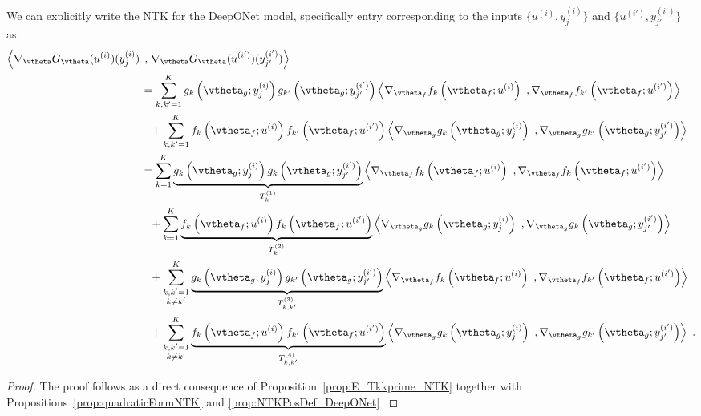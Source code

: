 We can explicitly write the NTK for the DeepONet model, specifically entry corresponding to the inputs $\{u^{(i)}, y^{(i)}_j\}$ and $\{u^{(i')}, y^{(i')}_{j'}\}$ as:
\begin{align}
    \begin{aligned}
        \left\langle  \nabla_{\vtheta}
        G_{\vtheta}(u^{(i)})(y^{(i)}_j) \right. &~,  \left.  \nabla_{\vtheta} G_{\vtheta}(u^{(i')})(y^{(i')}_{j'})  \right\rangle \\
        & = \sum_{k,k'=1}^K g_k\left(\vtheta_g; y^{(i)}_j\right) g_{k'}\left(\vtheta_g; y^{(i')}_{j'} \right) \left\langle \nabla_{\vtheta_f} f_k \left(\vtheta_f; u^{(i)}\right)~,  \nabla_{\vtheta_f} f_{k'} \left(\vtheta_f; u^{(i')}\right) \right\rangle \\
        & \phantom{=} + \sum_{k,k'=1}^K f_k \left(\vtheta_f; u^{(i)}\right) f_{k'} \left(\vtheta_f; u^{(i')}\right) \left\langle \nabla_{\vtheta_g} g_k\left(\vtheta_g; y^{(i)}_j\right)~, \nabla_{\vtheta_g} g_{k'}\left(\vtheta_g; y^{(i')}_{j'}\right) \right\rangle \\
        & = \sum_{k=1}^K \underbrace{g_k\left(\vtheta_g; y^{(i)}_j\right) g_{k}\left(\vtheta_g; y^{(i')}_{j'} \right)}_{T^{(1)}_k} \left\langle \nabla_{\vtheta_f} f_k \left(\vtheta_f; u^{(i)}\right)~,  \nabla_{\vtheta_f} f_{k} \left(\vtheta_f; u^{(i')}\right) \right\rangle \\
        & \phantom{=} + \sum_{k=1}^K \underbrace{f_k \left(\vtheta_f; u^{(i)}\right) f_{k} \left(\vtheta_f; u^{(i')}\right)}_{T^{(2)}_k} \left\langle \nabla_{\vtheta_g} g_k\left(\vtheta_g; y^{(i)}_j\right)~, \nabla_{\vtheta_g} g_{k}\left(\vtheta_g; y^{(i')}_{j'}\right) \right\rangle \\
        & \phantom{=} + \sum_{\substack{k,k'=1\\k \neq k'}}^K \underbrace{g_k\left(\vtheta_g; y^{(i)}_j\right) g_{k'}\left(\vtheta_g; y^{(i')}_{j'} \right)}_{T^{(3)}_{k,k'}} \left\langle \nabla_{\vtheta_f} f_k \left(\vtheta_f; u^{(i)}\right)~,  \nabla_{\vtheta_f} f_{k'} \left(\vtheta_f; u^{(i')}\right) \right\rangle \\
        & \phantom{=}  + \sum_{\substack{k,k'=1\\k \neq k'}}^K \underbrace{f_k \left(\vtheta_f; u^{(i)}\right) f_{k'} \left(\vtheta_f; u^{(i')}\right)}_{T^{(4)}_{k,k'}} \left\langle \nabla_{\vtheta_g} g_k\left(\vtheta_g; y^{(i)}_j\right)~, \nabla_{\vtheta_g} g_{k'}\left(\vtheta_g; y^{(i')}_{j'}\right) \right\rangle~. 
    \end{aligned}
    \label{eq:T3KKpNTK}
\end{align}
\NTKPD*
\begin{proof}
    The proof follows as a direct consequence of Proposition~\ref{prop:E_Tkkprime_NTK} together with Propositions~\ref{prop:quadraticFormNTK} and \ref{prop:NTKPosDef_DeepONet}
    \label{theo:NTKPosDef}
\end{proof}


